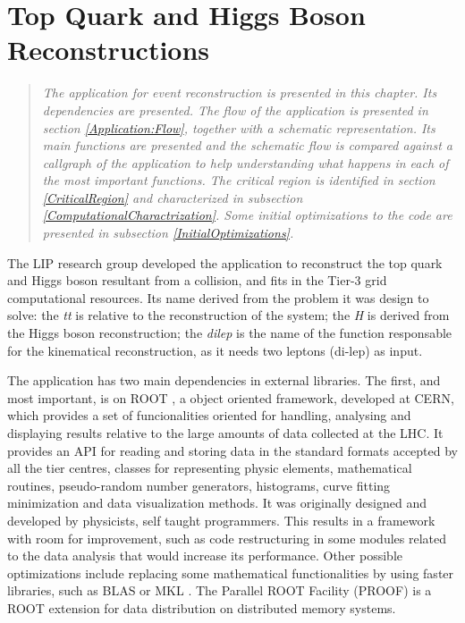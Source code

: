 \chapter{Top Quark and Higgs Boson Reconstructions}
\label{Application}

\begin{quote}
\textit{The \tth application for event reconstruction is presented in this chapter. Its dependencies are presented. The flow of the application is presented in section \ref{Application:Flow}, together with a schematic representation. Its main functions are presented and the schematic flow is compared against a callgraph of the application to help understanding what happens in each of the most important functions. The critical region is identified in section \ref{CriticalRegion} and characterized in subsection \ref{ComputationalCharactrization}. Some initial optimizations to the code are presented in subsection \ref{InitialOptimizations}.}
\end{quote}

The LIP research group developed the \tth application to reconstruct the top quark and Higgs boson resultant from a collision, and fits in the Tier-3 grid computational resources. Its name derived from the problem it was design to solve: the \textit{tt} is relative to the reconstruction of the \ttbar system; the \textit{H} is derived from the Higgs boson reconstruction; the \textit{dilep} is the name of the function responsable for the kinematical reconstruction, as it needs two leptons (di-lep) as input.

The application has two main dependencies in external libraries. The first, and most important, is on ROOT \cite{CERN:ROOT}, a object oriented framework, developed at CERN, which provides a set of funcionalities oriented for handling, analysing and displaying results relative to the large amounts of data collected at the LHC. It provides an API for reading and storing data in the standard formats accepted by all the tier centres, classes for representing physic elements, mathematical routines, pseudo-random number generators, histograms, curve fitting minimization and data visualization methods. It was originally designed and developed by physicists, self taught programmers. This results in a framework with room for improvement, such as code restructuring in some modules related to the data analysis that would increase its performance. Other possible optimizations include replacing some mathematical functionalities by using faster libraries, such as BLAS \cite{BLAS} or MKL \cite{MKL}. The Parallel ROOT Facility (PROOF) \cite{CERN:PROOF} is a ROOT extension for data distribution on distributed memory systems.

